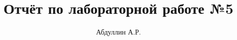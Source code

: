 \title{Отчёт по лабораторной работе №5}
\author{Абдуллин А.Р.}

\usepackage[a4paper, left=20mm, top=15mm, right=15mm, bottom=15mm]{geometry}
\setmainfont{Lato}

\usepackage{caption}
\captionsetup[figure]{name=Рисунок, labelsep=endash}

\renewcommand{\contentsname}{Оглавление}


\usepackage{titlesec}
\newcommand{\sectionbreak}{\clearpage}

\usepackage{fancyhdr}
\pagestyle{fancy}
\fancyhf{}
\renewcommand{\headrulewidth}{0pt}